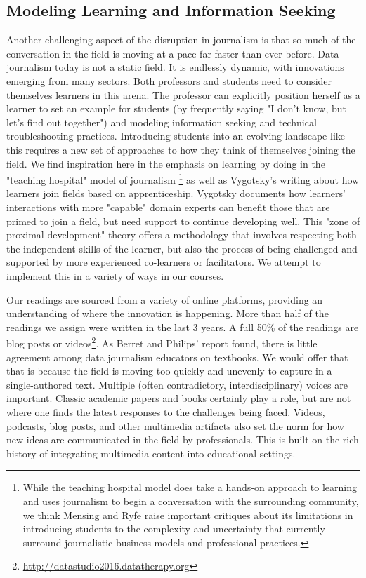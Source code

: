 \documentclass{acm_proc_article-sp}
\begin{document}
\subsection{Modeling Learning and Information Seeking}

Another challenging aspect of the disruption in journalism is that so much of the conversation in the field is moving at a pace far faster than ever before. Data journalism today is not a static field. It is endlessly dynamic, with innovations emerging from many sectors.  Both professors and students need to consider themselves learners in this arena. The professor can explicitly position herself as a learner to set an example for students (by frequently saying "I don't know, but let's find out together") and modeling information seeking and technical troubleshooting practices. Introducing students into an evolving landscape like this requires a new set of approaches to how they think of themselves joining the field. We find inspiration here in the emphasis on learning by doing in the "teaching hospital" model of journalism \footnote{While the teaching hospital model does take a hands-on approach to learning and uses journalism to begin a conversation with the surrounding community, we think Mensing and Ryfe \cite{mensing_blueprint_2013} raise important critiques about its limitations in introducing students to the complexity and uncertainty that currently surround journalistic business models and professional practices.} as well as Vygotsky's writing about how learners join fields based on apprenticeship\cite{vygotsky_mind_1980}.  Vygotsky documents how learners' interactions with more "capable" domain experts can benefit those that are primed to join a field, but need support to continue developing well.  This "zone of proximal development" theory offers a methodology that involves respecting both the independent skills of the learner, but also the process of being challenged and supported by more experienced co-learners or facilitators.  We attempt to implement this in a variety of ways in our courses.

Our readings are sourced from a variety of online platforms, providing an understanding of where the innovation is happening.  More than half of the readings we assign were written in the last 3 years.  A full 50\% of the readings are blog posts or videos\footnote{\url{http://datastudio2016.datatherapy.org}}. As Berret and Philips' report found, there is little agreement among data journalism educators on textbooks\cite{berret_teaching_2016}. We would offer that that is because the field is moving too quickly and unevenly to capture in a single-authored text. Multiple (often contradictory, interdisciplinary) voices are important.  Classic academic papers and books certainly play a role, but are not where one finds the latest responses to the challenges being faced. Videos, podcasts, blog posts, and other multimedia artifacts also set the norm for how new ideas are communicated in the field by professionals.  This is built on the rich history of integrating multimedia content into educational settings\cite{boling_individual_1999, pipes_multimedia_1996}.
\end{document}
